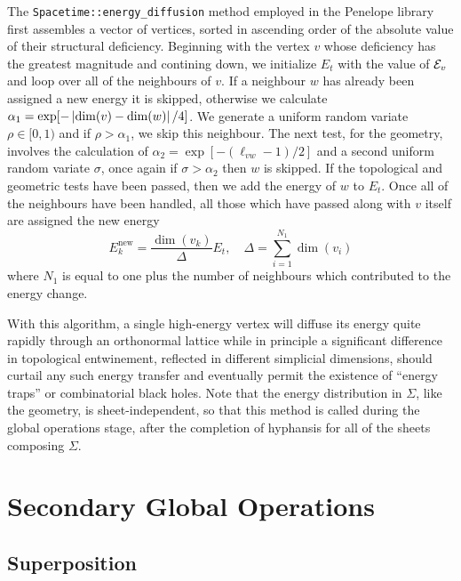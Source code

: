 \documentclass[12pt,letterpaper]{report}
\begin{document}
The \texttt{Spacetime::energy\_diffusion} method employed in the Penelope library first assembles a vector of 
vertices, sorted in ascending order of the absolute value of their structural deficiency. Beginning with 
the vertex $v$ whose deficiency has the greatest magnitude and contining down, we initialize $E_t$ with the 
value of ${\cal E}_v$ and loop over all of the neighbours of $v$. If a neighbour $w$ has already been 
assigned a new energy it is skipped, otherwise we calculate $\alpha_1 = \exp[-\left\lvert\dim(v) - \dim(w)\right\rvert/4]$. 
We generate a uniform random variate $\rho\in [0,1)$ and if $\rho > \alpha_1$, we skip this neighbour. The 
next test, for the geometry, involves the calculation of $\alpha_2 = \exp[-(\ell_{vw}-1)/2]$ and a second 
uniform random variate $\sigma$, once again if $\sigma > \alpha_2$ then $w$ is skipped. If the topological 
and geometric tests have been passed, then we add the energy of $w$ to $E_t$. Once all of the neighbours 
have been handled, all those which have passed along with $v$ itself are assigned the new energy 
\begin{equation}
E^\text{new}_k = \frac {\dim(v_k)}{\Delta} E_t, \quad \Delta = \sum_{i=1}^{N_1} \dim(v_i)       
\end{equation}
where $N_1$ is equal to one plus the number of neighbours which contributed to the energy change. 

With this algorithm, a single high-energy vertex will diffuse its energy quite rapidly through an 
orthonormal lattice while in principle a significant difference in topological entwinement, reflected 
in different simplicial dimensions, should curtail any such energy transfer and eventually permit the 
existence of ``energy traps'' or combinatorial black holes. Note that the energy distribution 
in $\Sigma$, like the geometry, is sheet-independent, so that this method is called during the global 
operations stage, after the completion of hyphansis for all of the sheets composing $\Sigma$.  

\section{Secondary Global Operations}

\subsection{Superposition}
\end{document}
